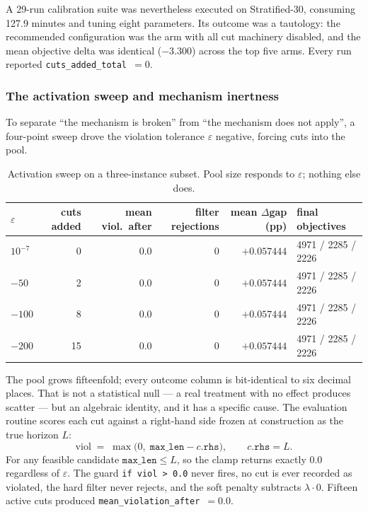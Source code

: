 \documentclass[11pt,a4paper]{article}
\begin{document}
A 29-run calibration suite was nevertheless executed on Stratified-30, consuming
127.9 minutes and tuning eight parameters. Its outcome was a tautology: the
recommended configuration was the arm with all cut machinery disabled, and the
mean objective delta was identical ($-3.300$) across the top five arms. Every run
reported \texttt{cuts\_added\_total}~$=0$.

\subsubsection{The activation sweep and mechanism inertness}\label{sec:cuts-inert}

To separate ``the mechanism is broken'' from ``the mechanism does not apply'', a
four-point sweep drove the violation tolerance $\varepsilon$ negative, forcing
cuts into the pool.

\begin{table}[htbp]
\centering
\caption{Activation sweep on a three-instance subset. Pool size responds to
$\varepsilon$; nothing else does.}
\label{tab:sweep}
\begin{tabular}{lrrrrl}
\toprule
$\varepsilon$ & cuts added & mean viol.\ after & filter rejections & mean $\Delta$gap (pp) & final objectives \\
\midrule
$10^{-7}$ & 0  & 0.0 & 0 & $+0.057444$ & 4971 / 2285 / 2226 \\
$-50$     & 2  & 0.0 & 0 & $+0.057444$ & 4971 / 2285 / 2226 \\
$-100$    & 8  & 0.0 & 0 & $+0.057444$ & 4971 / 2285 / 2226 \\
$-200$    & 15 & 0.0 & 0 & $+0.057444$ & 4971 / 2285 / 2226 \\
\bottomrule
\end{tabular}
\end{table}

The pool grows fifteenfold; every outcome column is bit-identical to six decimal
places. That is not a statistical null --- a real treatment with no effect produces
scatter --- but an algebraic identity, and it has a specific cause. The evaluation
routine scores each cut against a right-hand side frozen at construction as the
true horizon $L$:
\[
\text{viol} \;=\; \max\bigl(0,\; \texttt{max\_len}-c.\texttt{rhs}\bigr),
\qquad c.\texttt{rhs}=L .
\]
For any feasible candidate $\texttt{max\_len}\le L$, so the clamp returns exactly
$0.0$ regardless of $\varepsilon$. The guard \texttt{if viol > 0.0} never fires, no
cut is ever recorded as violated, the hard filter never rejects, and the soft
penalty subtracts $\lambda\cdot 0$. Fifteen active cuts produced
\texttt{mean\_violation\_after}~$=0.0$.
\end{document}
